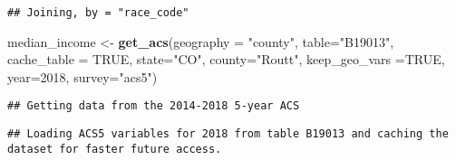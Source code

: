 \documentclass[]{article}
\newenvironment{Shaded}{\begin{snugshade}}{\end{snugshade}}
\newcommand{\DataTypeTok}[1]{\textcolor[rgb]{0.13,0.29,0.53}{#1}}
\newcommand{\DecValTok}[1]{\textcolor[rgb]{0.00,0.00,0.81}{#1}}
\newcommand{\KeywordTok}[1]{\textcolor[rgb]{0.13,0.29,0.53}{\textbf{#1}}}
\newcommand{\NormalTok}[1]{#1}
\newcommand{\OperatorTok}[1]{\textcolor[rgb]{0.81,0.36,0.00}{\textbf{#1}}}
\newcommand{\OtherTok}[1]{\textcolor[rgb]{0.56,0.35,0.01}{#1}}
\newcommand{\StringTok}[1]{\textcolor[rgb]{0.31,0.60,0.02}{#1}}
\begin{document}
\begin{Shaded}
\end{Shaded}

\begin{verbatim}
## Joining, by = "race_code"
\end{verbatim}

\begin{Shaded}
\begin{Highlighting}[]
\NormalTok{median_income <-}\StringTok{ }\KeywordTok{get_acs}\NormalTok{(}\DataTypeTok{geography =} \StringTok{"county"}\NormalTok{, }\DataTypeTok{table=}\StringTok{"B19013"}\NormalTok{, }\DataTypeTok{cache_table =} \OtherTok{TRUE}\NormalTok{, }\DataTypeTok{state=}\StringTok{"CO"}\NormalTok{, }\DataTypeTok{county=}\StringTok{"Routt"}\NormalTok{, }\DataTypeTok{keep_geo_vars =}\OtherTok{TRUE}\NormalTok{, }\DataTypeTok{year=}\DecValTok{2018}\NormalTok{, }\DataTypeTok{survey=}\StringTok{"acs5"}\NormalTok{)}
\end{Highlighting}
\end{Shaded}

\begin{verbatim}
## Getting data from the 2014-2018 5-year ACS
\end{verbatim}

\begin{verbatim}
## Loading ACS5 variables for 2018 from table B19013 and caching the dataset for faster future access.
\end{verbatim}
\end{document}
